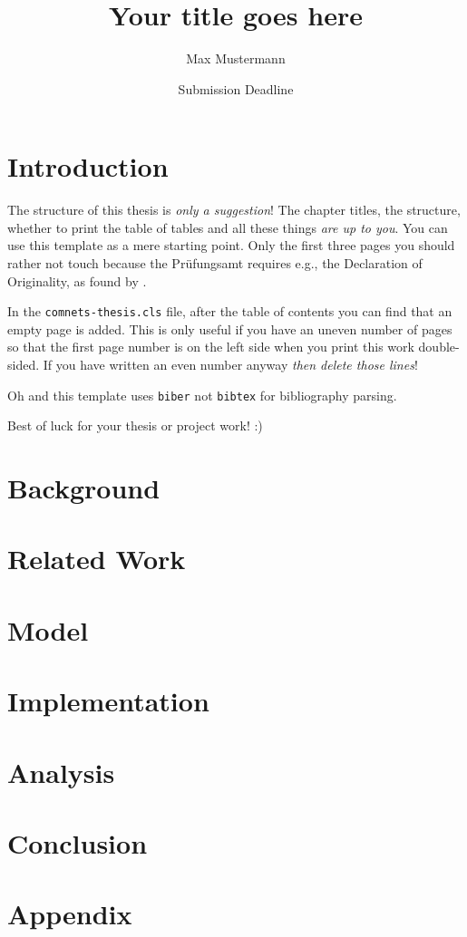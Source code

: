 \documentclass{comnets-thesis}
\title{Your title goes here}
\author{Max Mustermann}
\date{Submission Deadline}
\begin{document}
\maketitlepage

\chapter{Introduction}\label{chp:introduction}
The structure of this thesis is \emph{only a suggestion}!
The chapter titles, the structure, whether to print the table of tables and all these things \emph{are up to you}.
You can use this template as a mere starting point. 
Only the first three pages you should rather not touch because the Prüfungsamt requires e.g., the Declaration of Originality, as found by \cite{SuperSmartGuy}.

In the \texttt{comnets-thesis.cls} file, after the table of contents you can find that an empty page is added.
This is only useful if you have an uneven number of pages so that the first page number is on the left side when you print this work double-sided.
If you have written an even number anyway \emph{then delete those lines}!

Oh and this template uses \texttt{biber} not \texttt{bibtex} for bibliography parsing.

Best of luck for your thesis or project work! :)

\chapter{Background}\label{chp:background}
\chapter{Related Work}\label{chp:related}
\chapter{Model}\label{chp:model}
\chapter{Implementation}\label{chp:implementation}
\chapter{Analysis}\label{chp:analysis}
\chapter{Conclusion}\label{chp:conclusion}
\appendix
\chapter{Appendix}\label{chp:appendix}
\listoffigures
\listoftables
\printbibliography[heading=bibintoc]
\end{document}
